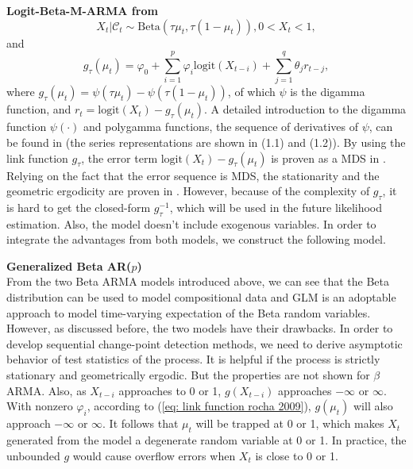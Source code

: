 \documentclass{article}
\theoremstyle{definition}
\begin{document}
\textbf{Logit-Beta-M-ARMA from \cite{zheng2015generalized}} \\
\begin{equation*}
X_t|\mathcal{C}_{t} \sim \text{Beta}(\tau \mu_t, \tau (1-\mu_t)),  0<X_t<1,
\end{equation*}
and 
\begin{equation*}
    g_{\tau}(\mu_t) = \varphi_0+\sum_{i=1}^p \varphi_i  \text{logit}(X_{t-i})+ \sum_{j=1}^q \theta_j r_{t-j},
\end{equation*}
where $g_{\tau}(\mu_t) = \psi(\tau \mu_t)-\psi(\tau (1-\mu_t))$, of which $\psi$ is the digamma function, and $r_t = \text{logit}(X_t) - g_{\tau}(\mu_t)$. A detailed introduction to the digamma function $\psi(\cdot)$ and polygamma functions, the sequence of derivatives of $\psi$, can be found in \cite{batir2007some} (the series representations are shown in (1.1) and (1.2)). By using the link function $g_{\tau}$, the error term $\text{logit}(X_t)-g_{\tau}(\mu_t)$ is proven as a MDS in \cite{zheng2015generalized}. Relying on the fact that the error sequence is MDS, the stationarity and the geometric ergodicity are proven in \cite{zheng2015generalized}. However, because of the complexity of $g_{\tau}$, it is hard to get the closed-form $g^{-1}_{\tau}$, which will be used in the future likelihood estimation. Also, the model doesn't include exogenous variables. In order to integrate the advantages from both models, we construct the following model. 

\textbf{Generalized Beta AR($p$)}\\
From the two Beta ARMA models introduced above, we can see that the Beta distribution can be used to model compositional data and GLM is an adoptable approach to model time-varying expectation of the Beta random variables. However, as discussed before, the two models have their drawbacks. In order to develop sequential change-point detection methods, we need to derive asymptotic behavior of test statistics of the process. It is helpful if the process is strictly stationary and geometrically ergodic. But the properties are not shown for $\beta$ARMA. Also, as $X_{t-i}$ approaches to 0 or 1, $g(X_{t-i})$ approaches $-\infty$ or $\infty$. With nonzero $\varphi_i$, according to (\ref{eq: link function rocha 2009}), $g(\mu_t)$ will also approach $-\infty$ or $\infty$. It follows that $\mu_t$ will be trapped at 0 or 1, which makes $X_t$ generated from the model a degenerate random variable at 0 or 1. In practice, the unbounded $g$ would cause overflow errors when $X_t$ is close to 0 or 1.
\end{document}
